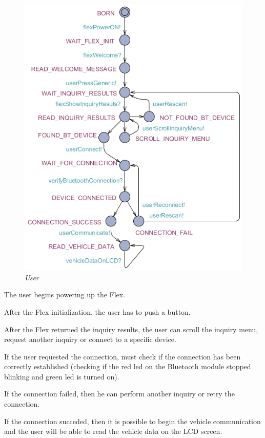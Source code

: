 \documentclass[paper=a4, fontsize=11pt]{scrartcl} %
\numberwithin{equation}{section} %
\numberwithin{figure}{section} %
\numberwithin{table}{section} %
\begin{document}
\begin{figure}[H]
  \centering
  \includegraphics[width=4.7in]{img/FLEX-OBD-LCD_user}
  \caption{\textit{User}}
\end{figure}

The user begins powering up the Flex.

After the Flex initialization, the user has to push a button.

After the Flex returned the inquiry results, the user can scroll the inquiry menu, request another inquiry or connect to a specific device.

If the user requested the connection, must check if the connection has been correctly established (checking if the red led on the Bluetooth module stopped blinking and green led is turned on).

If the connection failed, then he can perform another inquiry or retry the connection.

If the connection succeded, then it is possible to begin the vehicle communication and the user will be able to read the vehicle data on the LCD screen.
\end{document}
